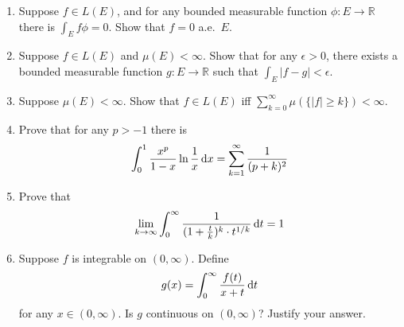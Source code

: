 \documentclass{article}
\begin{document}
\begin{enumerate}

\item Suppose $f\in L(E)$, and for any bounded measurable function $\phi: E \to \mathbb{R}$ there is $\int_{E} f\phi = 0$. Show that $f=0$ a.e.~$E$.




\item Suppose $f\in L(E)$ and $\mu(E) < \infty$. Show that for any $\epsilon > 0$, there exists a bounded measurable function $g: E \to \mathbb{R}$ such that $\int_{E} |f-g| < \epsilon$.





\item Suppose $\mu(E)< \infty$. Show that $f \in L(E)$ iff $\sum_{k=0}^{\infty} \mu(\{|f| \ge k\}) < \infty$.






\item Prove that for any $p > -1$ there is
\[
\int_{0}^{1} \frac{x^{p}}{1-x} \ln \frac{1}{x} \dif x = \sum_{k=1}^{\infty} \frac{1}{(p+k)^{2}}
\]





\item Prove that 
\[
\lim_{k \to \infty} \int_{0}^{\infty} \frac{1}{(1+ \frac{t}{k})^{k} \cdot t^{1/k}} \dif t = 1
\]





\item Suppose $f$ is integrable on $(0,\infty)$. Define 
\[
g(x) = \int_{0}^{\infty} \frac{f(t)}{x+t} \dif t
\] 
for any $x \in (0,\infty)$. Is $g$ continuous on $(0,\infty)$? Justify your answer.





\end{enumerate}
\end{document}
